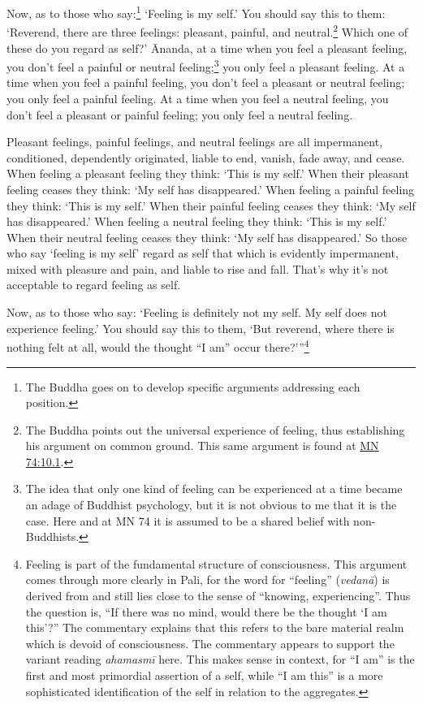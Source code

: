 \documentclass[12pt,openany]{book}%
\begin{document}
Now, as to those who say:\footnote{The Buddha goes on to develop specific arguments addressing each position. } ‘Feeling is my self.’ You should say this to them: ‘Reverend, there are three feelings: pleasant, painful, and neutral.\footnote{The Buddha points out the universal experience of feeling, thus establishing his argument on common ground. This same argument is found at \href{https://suttacentral.net/mn74/en/sujato\#10.1}{MN 74:10.1}. } Which one of these do you regard as self?’ Ānanda, at a time when you feel a pleasant feeling, you don’t feel a painful or neutral feeling;\footnote{The idea that only one kind of feeling can be experienced at a time became an adage of Buddhist psychology, but it is not obvious to me that it is the case. Here and at MN 74 it is assumed to be a shared belief with non-Buddhists. } you only feel a pleasant feeling. At a time when you feel a painful feeling, you don’t feel a pleasant or neutral feeling; you only feel a painful feeling. At a time when you feel a neutral feeling, you don’t feel a pleasant or painful feeling; you only feel a neutral feeling. 

Pleasant feelings, painful feelings, and neutral feelings are all impermanent, conditioned, dependently originated, liable to end, vanish, fade away, and cease. When feeling a pleasant feeling they think: ‘This is my self.’ When their pleasant feeling ceases they think: ‘My self has disappeared.’ When feeling a painful feeling they think: ‘This is my self.’ When their painful feeling ceases they think: ‘My self has disappeared.’ When feeling a neutral feeling they think: ‘This is my self.’ When their neutral feeling ceases they think: ‘My self has disappeared.’ So those who say ‘feeling is my self’ regard as self that which is evidently impermanent, mixed with pleasure and pain, and liable to rise and fall. That’s why it’s not acceptable to regard feeling as self. 

Now, as to those who say: ‘Feeling is definitely not my self. My self does not experience feeling.’ You should say this to them, ‘But reverend, where there is nothing felt at all, would the thought “I am” occur there?’”\footnote{Feeling is part of the fundamental structure of consciousness. This argument comes through more clearly in Pali, for the word for “feeling” (\textit{\textsanskrit{vedanā}}) is derived from and still lies close to the sense of “knowing, experiencing”. Thus the question is, “If there was no mind, would there be the thought ‘I am this’?” The commentary explains that this refers to the bare material realm which is devoid of consciousness. The commentary appears to support the variant reading \textit{\textsanskrit{ahamasmī}} here. This makes sense in context, for “I am” is the first and most primordial assertion of a self, while “I am this” is a more sophisticated identification of the self in relation to the aggregates. } 
\end{document}
